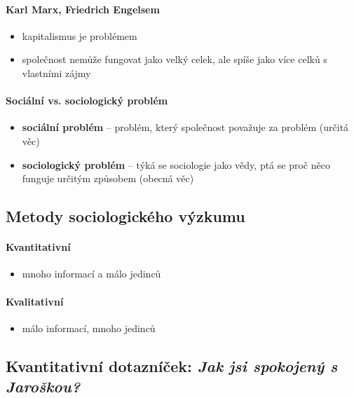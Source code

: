 \paragraph{Karl Marx, Friedrich Engelsem}
\begin{itemize}
\item kapitalismus je problémem
\item společnost nemůže fungovat jako velký celek, ale spíše jako více celků s vlastními zájmy
\end{itemize}

\paragraph{Sociální vs. sociologický problém}
\begin{itemize}
\item \textbf{sociální problém} -- problém, který společnost považuje za problém (určitá věc)
\item \textbf{sociologický problém} -- týká se sociologie jako vědy, ptá se proč něco funguje určitým způsobem (obecná věc)
\end{itemize}

\subsection{Metody sociologického výzkumu}
\paragraph{Kvantitativní}
\begin{itemize}
\item mnoho informací a málo jedinců
\end{itemize}
\paragraph{Kvalitativní}
\begin{itemize}
\item málo informací, mnoho jedinců
\end{itemize}

\subsection{Kvantitativní dotazníček: \textit{Jak jsi spokojený s Jaroškou?}}
